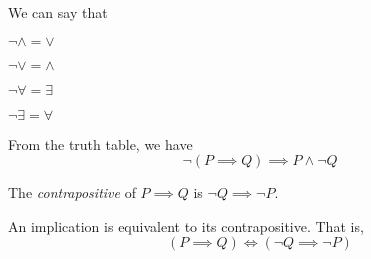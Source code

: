 \begin{named}[Note]
We can say that
\bitem
\item $\lnot \land = \lor$
\item $\lnot \lor = \land$
\item $\lnot \forall = \exists$
\item $\lnot \exists = \forall$
\eitem
\end{named}

From the truth table, we have 
$$\lnot (P \implies Q) \implies P \land \lnot Q$$

\begin{definition}
	The \emph{contrapositive} of $P \implies Q$ is $\lnot Q \implies \lnot P$.
\end{definition}

\begin{theorem}
	An implication is equivalent to its contrapositive. That is,
	$$(P \implies Q) \iff (\lnot Q \implies \lnot P)$$
\end{theorem}


